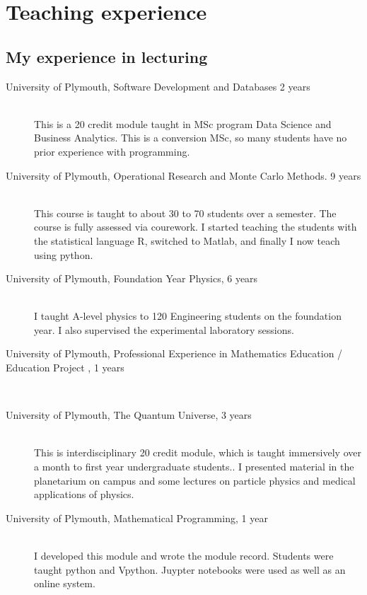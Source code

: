 \documentclass[12pt]{article}
\begin{document}
\FloatBarrier

%
\section{Teaching experience}

\subsection{My experience in lecturing}


\begin{description}

 \item[University of Plymouth, 
Software Development and Databases
2 years]\hfill \\ This is a 20 credit module taught in
MSc program Data Science and Business Analytics. This is a conversion
MSc, so many students have no prior experience with programming.

  \item[University of Plymouth, Operational Research and Monte Carlo Methods.
9 years] \hfill \\
This course is taught to about 30 to 70 students over a semester. The course is fully
assessed via courework. I started teaching the students with the statistical language R, switched 
to Matlab, and finally I now teach using python.

  \item[University of Plymouth, Foundation Year Physics,
6 years] \hfill \\
I taught A-level physics to 120 Engineering students
on the foundation year. I also supervised the experimental 
laboratory sessions.

\item[University of Plymouth, Professional Experience in Mathematics
  Education / Education Project ,
1 years] \hfill \\

  \item[University of Plymouth, The Quantum Universe,
3 years] \hfill \\
This is interdisciplinary 20 credit module, which is taught
immersively over a month to first year undergraduate students.. 
I presented material in the planetarium on campus and some lectures on
particle physics and medical applications of physics.

  \item[University of Plymouth, Mathematical Programming,
1 year] \hfill \\
I developed this module and wrote the module record. Students
were taught python and Vpython. Juypter notebooks were used as well
as an online system.


\end{description}
\end{document}
